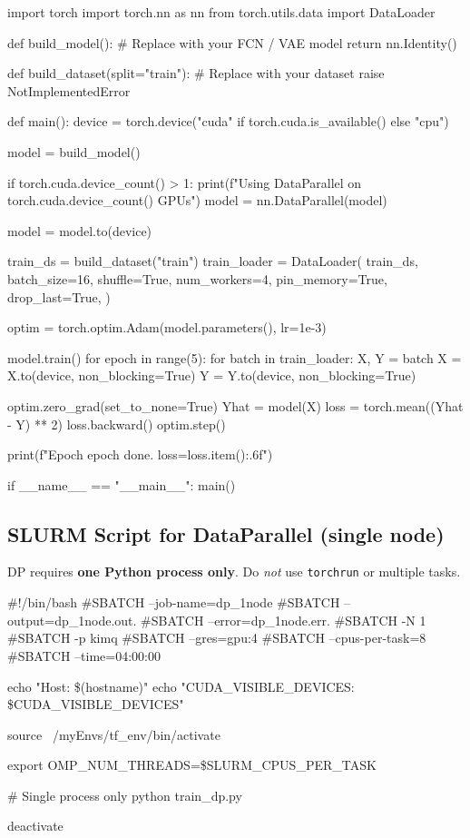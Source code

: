 \documentclass[11pt]{article}
\begin{document}
\begin{codeblock}[language=python,caption={Minimal PyTorch DataParallel training skeleton (\texttt{train\_dp.py})}]
import torch
import torch.nn as nn
from torch.utils.data import DataLoader

def build_model():
    # Replace with your FCN / VAE model
    return nn.Identity()

def build_dataset(split="train"):
    # Replace with your dataset
    raise NotImplementedError

def main():
    device = torch.device("cuda" if torch.cuda.is_available() else "cpu")

    model = build_model()

    if torch.cuda.device_count() > 1:
        print(f"Using DataParallel on {torch.cuda.device_count()} GPUs")
        model = nn.DataParallel(model)

    model = model.to(device)

    train_ds = build_dataset("train")
    train_loader = DataLoader(
        train_ds,
        batch_size=16,
        shuffle=True,
        num_workers=4,
        pin_memory=True,
        drop_last=True,
    )

    optim = torch.optim.Adam(model.parameters(), lr=1e-3)

    model.train()
    for epoch in range(5):
        for batch in train_loader:
            X, Y = batch
            X = X.to(device, non_blocking=True)
            Y = Y.to(device, non_blocking=True)

            optim.zero_grad(set_to_none=True)
            Yhat = model(X)
            loss = torch.mean((Yhat - Y) ** 2)
            loss.backward()
            optim.step()

        print(f"Epoch {epoch} done. loss={loss.item():.6f}")

if __name__ == "__main__":
    main()
\end{codeblock}

\subsection{SLURM Script for DataParallel (single node)}
DP requires \textbf{one Python process only}. Do \emph{not} use \texttt{torchrun}
or multiple tasks.

\begin{codeblock}[caption={SLURM script for DataParallel (\texttt{dp\_1node.slurm})}]
#!/bin/bash
#SBATCH --job-name=dp_1node
#SBATCH --output=dp_1node.out.%
#SBATCH --error=dp_1node.err.%
#SBATCH -N 1
#SBATCH -p kimq
#SBATCH --gres=gpu:4
#SBATCH --cpus-per-task=8
#SBATCH --time=04:00:00

echo "Host: \$(hostname)"
echo "CUDA_VISIBLE_DEVICES: \$CUDA_VISIBLE_DEVICES"

source ~/myEnvs/tf_env/bin/activate

export OMP_NUM_THREADS=\$SLURM_CPUS_PER_TASK

# Single process only
python train_dp.py

deactivate
\end{codeblock}
\end{document}

